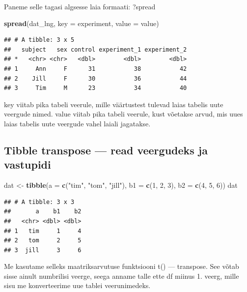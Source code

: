 \documentclass[]{book}
\newenvironment{Shaded}{\begin{snugshade}}{\end{snugshade}}
\newcommand{\KeywordTok}[1]{\textcolor[rgb]{0.13,0.29,0.53}{\textbf{#1}}}
\newcommand{\DataTypeTok}[1]{\textcolor[rgb]{0.13,0.29,0.53}{#1}}
\newcommand{\DecValTok}[1]{\textcolor[rgb]{0.00,0.00,0.81}{#1}}
\newcommand{\StringTok}[1]{\textcolor[rgb]{0.31,0.60,0.02}{#1}}
\newcommand{\NormalTok}[1]{#1}
\begin{document}
Paneme selle tagasi algsesse laia formaati: ?spread

\begin{Shaded}
\begin{Highlighting}[]
\KeywordTok{spread}\NormalTok{(dat_lng, }\DataTypeTok{key =}\NormalTok{ experiment, }\DataTypeTok{value =}\NormalTok{ value)}
\end{Highlighting}
\end{Shaded}

\begin{verbatim}
## # A tibble: 3 x 5
##   subject   sex control experiment_1 experiment_2
## *   <chr> <chr>   <dbl>        <dbl>        <dbl>
## 1     Ann     F      31           38           42
## 2    Jill     F      30           36           44
## 3     Tim     M      23           34           40
\end{verbatim}

key viitab pika tabeli veerule, mille väärtustest tulevad laias tabelis
uute veergude nimed. value viitab pika tabeli veerule, kust võetakse
arvud, mis uues laias tabelis uute veergude vahel laiali jagatakse.

\subsection{Tibble transpose --- read veergudeks ja
vastupidi}\label{tibble-transpose-read-veergudeks-ja-vastupidi}

\begin{Shaded}
\begin{Highlighting}[]
\NormalTok{dat <-}\StringTok{ }\KeywordTok{tibble}\NormalTok{(}\DataTypeTok{a =} \KeywordTok{c}\NormalTok{(}\StringTok{"tim"}\NormalTok{, }\StringTok{"tom"}\NormalTok{, }\StringTok{"jill"}\NormalTok{), }\DataTypeTok{b1 =} \KeywordTok{c}\NormalTok{(}\DecValTok{1}\NormalTok{, }\DecValTok{2}\NormalTok{, }\DecValTok{3}\NormalTok{), }\DataTypeTok{b2 =} \KeywordTok{c}\NormalTok{(}\DecValTok{4}\NormalTok{, }\DecValTok{5}\NormalTok{, }\DecValTok{6}\NormalTok{))}
\NormalTok{dat}
\end{Highlighting}
\end{Shaded}

\begin{verbatim}
## # A tibble: 3 x 3
##       a    b1    b2
##   <chr> <dbl> <dbl>
## 1   tim     1     4
## 2   tom     2     5
## 3  jill     3     6
\end{verbatim}

Me kasutame selleks maatriksarvutuse funktsiooni t() --- transpose. See
võtab sisse ainult numbrilisi veerge, seega anname talle ette df miinus
1. veerg, mille sisu me konverteerime uue tablei veerunimedeks.
\end{document}
